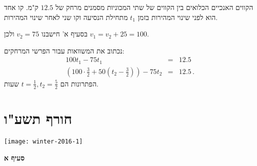 הקווים האנכיים הכלואים בין הקווים של שתי המכוניות מסמנים מרחק של
$12.5$
ק"מ. קו אחד הוא לפני שינוי המהירות בזמן
$t_1$
מתחילת הנסיעה וקו שני לאחר שינוי המהירות.

בסעיף א' חישבנו
$v_2=75$
ולכן
$v_1=v_2+25=100$.

\smallskip

נכתוב את המשוואות עבור הפרשי המרחקים:
\begin{eqnarray*}
100t_1 - 75t_1 &=& 12.5\\
\left(100\cdot \frac{3}{2} + 50\left(t_2-\frac{3}{2}\right)\right) - 75t_2&=& 12.5\,.
\end{eqnarray*}
הפתרונות הם
$\displaystyle t=\frac{1}{2}, t_2=\frac{5}{2}$
שעות.



\np

\section{חורף תשע"ו}

\begin{center}
\texttt{[image: winter-2016-1]}
\end{center}

\textbf{סעיף א}

